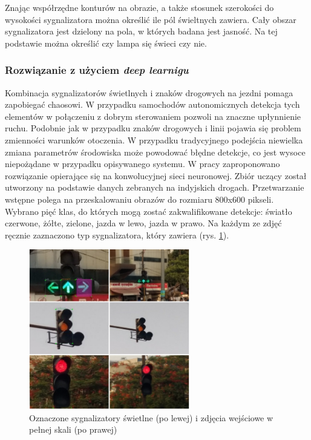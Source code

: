 
Znając współrzędne konturów na obrazie, a także stosunek szerokości do wysokości sygnalizatora można określić ile pól świeltnych zawiera. 
Cały obszar sygnalizatora jest dzielony na pola, w których badana jest jasność. Na tej podstawie można określić czy lampa się świeci czy nie.

\subsubsection{Rozwiązanie z użyciem \textit{deep learnigu}}

Kombinacja sygnalizatorów świetlnych i znaków drogowych na jezdni pomaga zapobiegać chaosowi. 
W przypadku samochodów autonomicznych detekcja tych elementów w połączeniu z dobrym sterowaniem pozwoli na znaczne upłynnienie ruchu.
Podobnie jak w przypadku znaków drogowych i linii pojawia się problem zmienności warunków otoczenia. 
W przypadku tradycyjnego podejścia niewielka zmiana parametrów środowiska może powodować błędne detekcje, co jest wysoce niepożądane w przypadku opisywanego systemu.
W pracy \cite{T10} zaproponowano rozwiązanie opierające się na konwolucyjnej sieci neuronowej.
Zbiór uczący został utworzony na podstawie danych zebranych na indyjskich drogach. 
Przetwarzanie wstępne polega na przeskalowaniu obrazów do rozmiaru 800x600 pikseli. 
Wybrano pięć klas, do których mogą zostać zakwalifikowane detekcje: światło czerwone, żółte, zielone, jazda w lewo, jazda w prawo. 
Na każdym ze zdjęć ręcznie zaznaczono typ sygnalizatora, który zawiera (rys. \ref{fig:traffic_light3_labels}).

\begin{figure}
  \centering
  \includegraphics[width=7cm]{img/traffic_light3_labels.png}
  \caption{Oznaczone sygnalizatory świetlne (po lewej) i zdjęcia wejściowe w pełnej skali (po prawej)\cite{T10}}
  \label{fig:traffic_light3_labels}
\end{figure}

